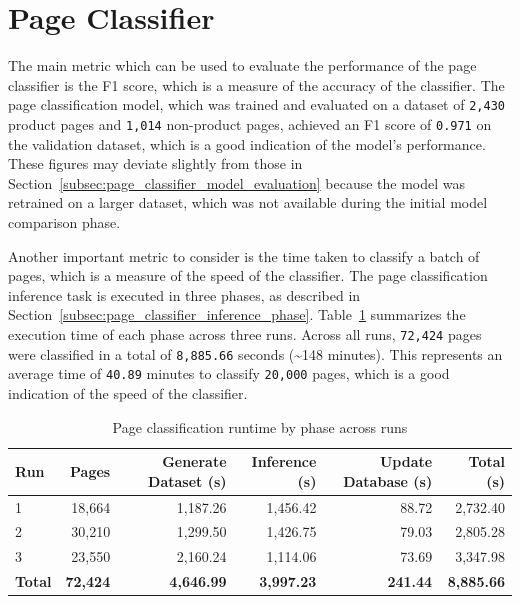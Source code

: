 \section{Page Classifier}\label{sec:page_classifier_evaluation}

The main metric which can be used to evaluate the performance of the page classifier is the F1 score, which is a measure of the accuracy of the classifier.
The page classification model, which was trained and evaluated on a dataset of \texttt{2,430} product pages and \texttt{1,014} non-product pages, achieved an F1 score of \texttt{0.971} on the validation dataset, which is a good indication of the model's performance.
These figures may deviate slightly from those in Section~\ref{subsec:page_classifier_model_evaluation} because the model was retrained on a larger dataset, which was not available during the initial model comparison phase.

Another important metric to consider is the time taken to classify a batch of pages, which is a measure of the speed of the classifier.
The page classification inference task is executed in three phases, as described in Section~\ref{subsec:page_classifier_inference_phase}.
Table~\ref{tab:page-classifier-runtime} summarizes the execution time of each phase across three runs.
Across all runs, \texttt{72,424} pages were classified in a total of \texttt{8,885.66} seconds (\textasciitilde{}148 minutes).
This represents an average time of \texttt{40.89} minutes to classify \texttt{20,000} pages, which is a good indication of the speed of the classifier.

\begin{table}[H]
    \centering
    \begin{tabular}{lrrrrr}
        \toprule
        \textbf{Run} & \textbf{Pages} & \textbf{Generate Dataset (s)} & \textbf{Inference (s)} & \textbf{Update Database (s)} & \textbf{Total (s)} \\
        \midrule
        1 & 18,664 & 1,187.26 & 1,456.42 & 88.72 & 2,732.40 \\
        2 & 30,210 & 1,299.50 & 1,426.75 & 79.03 & 2,805.28 \\
        3 & 23,550 & 2,160.24 & 1,114.06 & 73.69 & 3,347.98 \\
        \midrule
        \textbf{Total} & \textbf{72,424} & \textbf{4,646.99} & \textbf{3,997.23} & \textbf{241.44} & \textbf{8,885.66} \\
        \bottomrule
    \end{tabular}
    \caption{Page classification runtime by phase across runs}
    \label{tab:page-classifier-runtime}
\end{table}

